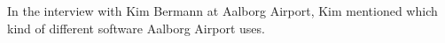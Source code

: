 
In the interview with Kim Bermann at Aalborg Airport, Kim mentioned which kind of different software Aalborg Airport uses.






